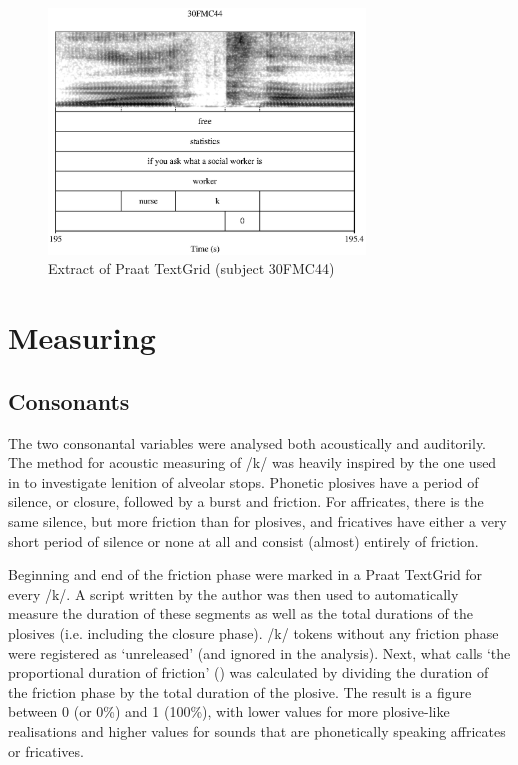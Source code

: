 	\begin{figure}
		
			
			\includegraphics[width=0.75\textwidth]{figures/TextGrid_screenshot}
		\caption{Extract of Praat TextGrid (subject 30FMC44)}
		\label{fig.textgrid.ex}
	\end{figure}

	\section{Measuring}\label{sec.prod_method.measuring}

		\subsection{Consonants}\label{sec.prod_method.con}

The two consonantal variables were analysed both acoustically and auditorily.
The method for acoustic measuring of /k/ was heavily inspired by the one used in \citealt{sangster2001} to investigate lenition of alveolar stops. Phonetic plosives have a period of silence, or closure, followed by a burst and friction. For affricates, there is the same silence, but more friction than for plosives, and fricatives have either a very short period of silence or none at all and consist (almost) entirely of friction. 

Beginning and end of the friction phase were marked in a Praat TextGrid for every /k/. 
A script written by the author was then used to automatically measure the duration of these segments as well as the total durations of the plosives (i.e. including the closure phase).
/k/ tokens without any friction phase were registered as `unreleased' (and ignored in the analysis).
Next, what \citeauthor{sangster2001} calls `the proportional duration of friction' () was calculated by dividing the duration of the friction phase by the total duration of the plosive. The result is a figure between 0 (or 0\%) and 1 (100\%), with lower values for more plosive-like realisations and higher values for sounds that are phonetically speaking affricates or fricatives.

